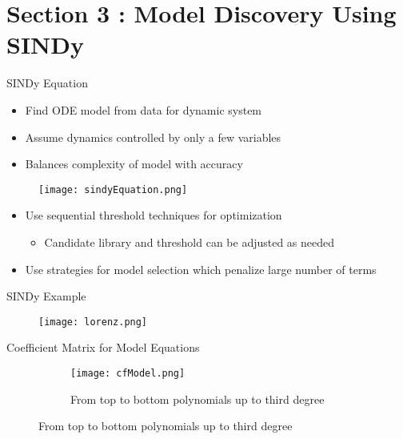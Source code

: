 \documentclass[9pt,xcolor=dvipsnames]{beamer}
\begin{document}
\section{Section 3 : Model Discovery Using SINDy}
\begin{frame}{SINDy Equation}
\begin{itemize}
    \item Find ODE model from data for dynamic system
    \item Assume dynamics controlled by only a few variables
    \item Balances complexity of model with accuracy
\end{itemize}
\begin{figure} 
        \centering
        \texttt{[image: sindyEquation.png]} \hspace{1pt}
\end{figure}
\begin{itemize}
    \item Use sequential threshold techniques for optimization
    \begin{itemize}
        \item Candidate library and threshold can be adjusted as needed
    \end{itemize}
    \item Use strategies for model selection which penalize large number of terms \cite{Brunton2016}
\end{itemize}
\end{frame}

\begin{frame}{SINDy Example}
\begin{figure} 
        \centering
        \texttt{[image: lorenz.png]} \hspace{1pt}
\end{figure}
\end{frame}

\begin{frame}{Coefficient Matrix for Model Equations}
\begin{figure} 
        \centering
        \begin{figure}
            \centering
            \texttt{[image: cfModel.png]}
            \caption{From top to bottom polynomials up to third degree}
        \end{figure} 
\end{figure}
\end{frame}
\end{document}
